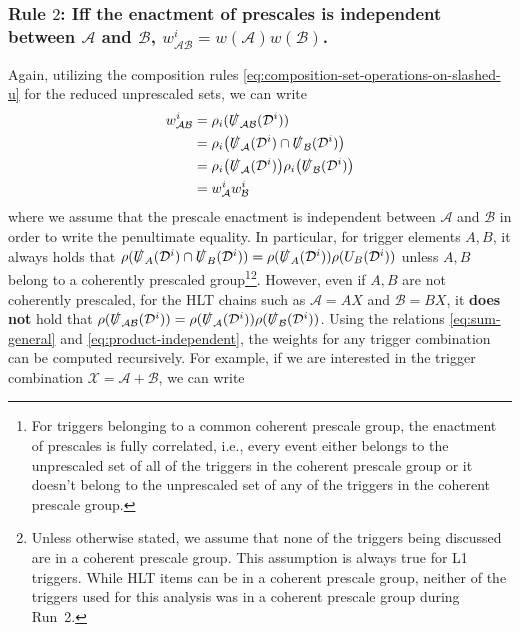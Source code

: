 \subsubsection*{Rule $2$: Iff the enactment of prescales is independent between $\mathcal{A}$ and $\mathcal{B}$, $w^i_{\mathcal{A}\mathcal{B}}=w(\mathcal{A})w(\mathcal{B})$.}
Again, utilizing the composition rules \eqref{eq:composition-set-operations-on-slashed-u} for the reduced unprescaled sets, we can write
\begin{align}
\label{eq:product-independent}
    w^i_{\mathcal{A}\mathcal{B}}&=\rho_i(\slashed{U}_\mathcal{AB}(\mathcal{D}^i))\\
    &=\rho_i\big(\slashed{U}_\mathcal{A}(\mathcal{D}^i)\cap \slashed{U}_\mathcal{B}(\mathcal{D}^i)\big)\\
    &=\rho_i\big(\slashed{U}_\mathcal{A}(\mathcal{D}^i)\big)\rho_i\big(\slashed{U}_\mathcal{B}(\mathcal{D}^i)\big)\\
    &=w^i_{\mathcal{A}}w^i_{\mathcal{B}}
\end{align}
where we assume that the prescale enactment is independent between $\mathcal{A}$ and $\mathcal{B}$ in order to write the penultimate equality. %
In particular, for trigger elements $A, B$, it always holds that $\rho(\slashed{U}_A(\mathcal{D}^i)\cap \slashed{U}_B(\mathcal{D}^i))=\rho(\slashed{U}_A(\mathcal{D}^i))\rho(U_B(\mathcal{D}^i))$ unless $A, B$ belong to a coherently prescaled group\footnote{For triggers belonging to a common coherent prescale group, the enactment of prescales is fully correlated, i.e., every event either belongs to the unprescaled set of all of the triggers in the coherent prescale group or it doesn't belong to the unprescaled set of any of the triggers in the coherent prescale group.}\footnote{Unless otherwise stated, we assume that none of the triggers being discussed are in a coherent prescale group. This assumption is always true for L1 triggers. While HLT items can be in a coherent prescale group, neither of the triggers used for this analysis was in a coherent prescale group during Run~2.}. %
However, even if $A, B$ are not coherently prescaled, for the HLT chains such as $\mathcal{A}=AX$ and $\mathcal{B}=BX$, it \textbf{does not} hold that $\rho(\slashed{U}_{\mathcal{A}\mathcal{B}}(\mathcal{D}^i))=\rho(\slashed{U}_{\mathcal{A}}(\mathcal{D}^i))\rho(\slashed{U}_{\mathcal{B}}(\mathcal{D}^i))$. %
Using the relations \ref{eq:sum-general} and \ref{eq:product-independent}, the weights for any trigger combination can be computed recursively. %
For example, if we are interested in the trigger combination $\mathcal{X}=\mathcal{A}+\mathcal{B}$, we can write
